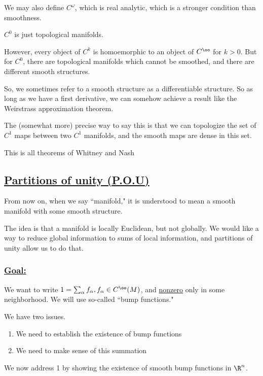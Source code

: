 \documentclass[x11names,reqno,14pt]{extarticle}
\begin{document}
We may also define $C^\omega$, which is real analytic, which is a stronger condition than smoothness. 

$C^0$ is just topological manifolds. 

However, every object of $C^k$ is homoemorphic to an object of $C^\oo$ for $k > 0$. But for $C^0$, there are topological manifolds which cannot be smoothed, and there are different smooth structures. 

So, we sometimes refer to a smooth structure as a differentiable structure. So as long as we have a first derivative, we can somehow achieve a result like the Weirstrass approximation theorem. 

The (somewhat more) precise way to say this is that we can topologize the set of $C^1$ maps between two $C^1$ manifolds, and the smooth maps are dense in this set. 

This is all theorems of Whitney and Nash

\subsection*{\underline{Partitions of unity (P.O.U)}}

From now on, when we say ``manifold," it is understood to mean a smooth manifold with some smooth structure. 

The idea is that a manifold is locally Euclidean, but not globally. We would like a way to reduce global information to sums of local information, and partitions of unity allow us to do that. 

\subsubsection*{\underline{Goal:}}

We want to write $1 = \sum_\alpha f_\alpha, f_\alpha \in C^\oo(M)$, and \underline{nonzero} only in some neighborhood. We will use so-called ``bump functions."

We have two issues. 

\begin{enumerate}

\item We need to establish the existence of bump functions

\item We need to make sense of this summation

\end{enumerate}

We now address 1 by showing the existence of smooth bump functions in $\R^n$. 
\end{document}
